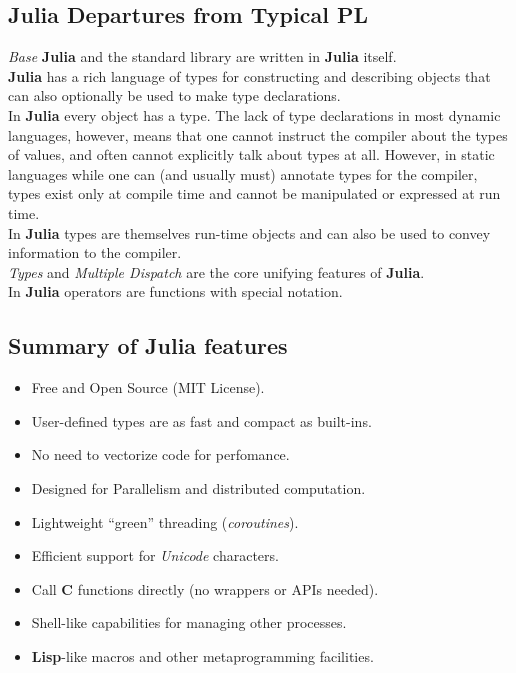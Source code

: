 \documentclass[
]{article}
\providecommand{\tightlist}{%
  \setlength{\itemsep}{0pt}\setlength{\parskip}{0pt}}
\begin{document}
\hypertarget{julia-departures-from-typical-pl}{%
\subsection{Julia Departures from Typical
PL}\label{julia-departures-from-typical-pl}}

\emph{Base} \textbf{Julia} and the standard library are written in
\textbf{Julia} itself.\\
\textbf{Julia} has a rich language of types for constructing and
describing objects that can also optionally be used to make type
declarations.\\
In \textbf{Julia} every object has a type. The lack of type declarations
in most dynamic languages, however, means that one cannot instruct the
compiler about the types of values, and often cannot explicitly talk
about types at all. However, in static languages while one can (and
usually must) annotate types for the compiler, types exist only at
compile time and cannot be manipulated or expressed at run time.\\
In \textbf{Julia} types are themselves run-time objects and can also be
used to convey information to the compiler.\\
\emph{Types} and \emph{Multiple Dispatch} are the core unifying features
of \textbf{Julia}.\\
In \textbf{Julia} operators are functions with special notation.

\hypertarget{summary-of-julia-features}{%
\subsection{Summary of Julia
features}\label{summary-of-julia-features}}

\begin{itemize}
\tightlist
\item
  Free and Open Source (MIT License).
\item
  User-defined types are as fast and compact as built-ins.
\item
  No need to vectorize code for perfomance.
\item
  Designed for Parallelism and distributed computation.
\item
  Lightweight ``green'' threading (\emph{coroutines}).
\item
  Efficient support for \emph{Unicode} characters.
\item
  Call \textbf{C} functions directly (no wrappers or APIs needed).
\item
  Shell-like capabilities for managing other processes.
\item
  \textbf{Lisp}-like macros and other metaprogramming facilities.
\end{itemize}
\end{document}
